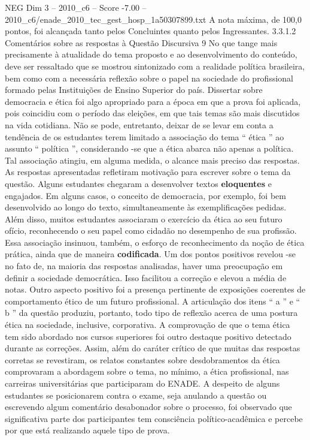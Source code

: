 \begin{textsample}{NEG Dim 3 – 2010\_c6 – Score -7.00 – 2010\_c6/enade\_2010\_tec\_gest\_hosp\_1a50307899.txt}
A nota máxima, de 100,0 pontos, foi alcançada tanto pelos Concluintes quanto pelos Ingressantes. 3.3.1.2 Comentários sobre as respostas à Questão Discursiva 9 No que tange mais precisamente à atualidade do tema proposto e ao desenvolvimento do conteúdo, deve ser ressaltado que se mostrou sintonizado com a realidade política brasileira, bem como com a necessária reflexão sobre o papel na sociedade do profissional formado pelas Instituições de Ensino Superior do país.
Dissertar sobre democracia e ética foi algo apropriado para a época em que a prova foi aplicada, pois coincidiu com o período das eleições, em que tais temas são mais discutidos na vida cotidiana.
Não se pode, entretanto, deixar de se levar em conta a tendência de os estudantes terem limitado a associação do tema “ ética ” ao assunto “ política ”, considerando -se que a ética abarca não apenas a política.
Tal associação atingiu, em alguma medida, o alcance mais preciso das respostas.
As respostas apresentadas refletiram motivação para escrever sobre o tema da questão.
Alguns estudantes chegaram a desenvolver textos \textbf{eloquentes} e engajados.
Em alguns casos, o conceito de democracia, por exemplo, foi bem desenvolvido ao longo do texto, simultaneamente às exemplificações pedidas.
Além disso, muitos estudantes associaram o exercício da ética ao seu futuro ofício, reconhecendo o seu papel como cidadão no desempenho de sua profissão.
Essa associação insinuou, também, o esforço de reconhecimento da noção de ética prática, ainda que de maneira \textbf{codificada}.
Um dos pontos positivos revelou -se no fato de, na maioria das respostas analisadas, haver uma preocupação em definir a sociedade democrática.
Isso facilitou a correção e elevou a média de notas.
Outro aspecto positivo foi a presença pertinente de exposições coerentes de comportamento ético de um futuro profissional.
A articulação dos itens “ a ” e “ b ” da questão produziu, portanto, todo tipo de reflexão acerca de uma postura ética na sociedade, inclusive, corporativa.
A comprovação de que o tema ética tem sido abordado nos cursos superiores foi outro destaque positivo detectado durante as correções.
Assim, além do caráter crítico de que muitas das respostas corretas se revestiram, os relatos constantes sobre desdobramentos da ética comprovaram a abordagem sobre o tema, no mínimo, a ética profissional, nas carreiras universitárias que participaram do ENADE.
A despeito de alguns estudantes se posicionarem contra o exame, seja anulando a questão ou escrevendo algum comentário desabonador sobre o processo, foi observado que significativa parte dos participantes tem consciência político-acadêmica e percebe por que está realizando aquele tipo de prova.

\end{textsample}

